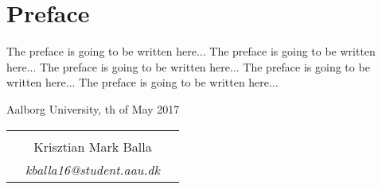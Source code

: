 \chapter*{Preface}

The preface is going to be written here... 
The preface is going to be written here... 
The preface is going to be written here... 
The preface is going to be written here... 
The preface is going to be written here... 

\hfill Aalborg University, th of May 2017




\vfill

\begin{table}[H]
	\centering
		\begin{tabular}{c c c}
			& \underline{\phantom{mmmmmmmmmmmmmmmmmmm}} 	& \\
			& Krisztian Mark Balla					& \\
			& \textit{kballa16@student.aau.dk}		& \\
		\end{tabular}
\end{table}
